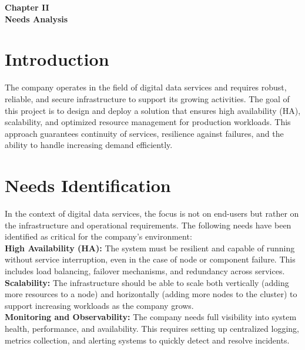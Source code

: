 \documentclass[a4paper,12pt]{report}
\begin{document}
\setcounter{chapter}{2}
\begin{doublespace}
{}
\vspace*{10cm}
\centering
\textbf{ \huge Chapter II \\ [1 cm] Needs Analysis}
\end{doublespace}
\setcounter{section}{0}
\newpage
\fancyhead[R]{\nouppercase{\rightmark}}
\begin{doublespace}
\section{Introduction}
\hspace{1cm}The company operates in the field of digital data services and requires robust, reliable, and secure infrastructure to support its growing activities. The goal of this project is to design and deploy a solution that ensures high availability (HA), scalability, and optimized resource management for production workloads. This approach guarantees continuity of services, resilience against failures, and the ability to handle increasing demand efficiently.

\section{Needs Identification}
\hspace{1cm}In the context of digital data services, the focus is not on end-users but rather on the infrastructure and operational requirements. The following needs have been identified as critical for the company’s environment: \\

\textbf{High Availability (HA):}  
The system must be resilient and capable of running without service interruption, even in the case of node or component failure. This includes load balancing, failover mechanisms, and redundancy across services. \\

\textbf{Scalability:}  
The infrastructure should be able to scale both vertically (adding more resources to a node) and horizontally (adding more nodes to the cluster) to support increasing workloads as the company grows. \\

\textbf{Monitoring and Observability:}  
The company needs full visibility into system health, performance, and availability. This requires setting up centralized logging, metrics collection, and alerting systems to quickly detect and resolve incidents. \\


\end{doublespace}
\end{document}
